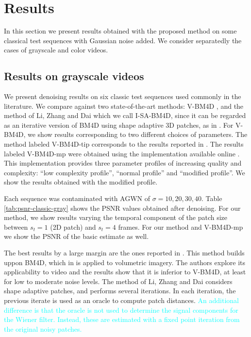 \documentclass[10pt, journal, twocolumn, final, a4paper]{IEEEtran}
\newcommand{\pa}[1]{\textcolor{cyan}{#1}}
\newcommand{\padd}[1]{\pa{#1}}
\begin{document}
\section{Results}
\label{sec:results}

In this section we present results obtained with the proposed
method on some classical test sequences with Gaussian noise added.
We consider separatedly the cases of grayscale and color videos.

\subsection{Results on grayscale videos}

We present denoising results on six classic test sequences used commonly in the
literature. We compare against two state-of-the-art methods: V-BM4D
\cite{Maggioni2012}, and the method of Li, Zhang and Dai \cite{LiZhangDai2011}
which we call I-SA-BM4D, since it can be regarded as an iterative version of BM4D \cite{Maggioni2013}
using shape adaptive 3D patches, as in \cite{Ercole2005}.  
For V-BM4D, we show results corresponding to two
different choices of parameters. The method labeled V-BM4D-tip
corresponds to the results reported
in \cite{Maggioni2012}. The results labeled V-BM4D-mp were
obtained using the implementation available online \cite{bm4dcode}. This
implementation provides three parameter profiles of increasing quality and
complexity: ``low complexity profile'', ``normal profile'' and ``modified
profile''. We show the results obtained with the modified profile.

Each sequence was contaminated with AGWN of $\sigma =
10,20,30,40$. Table \ref{tab:psnr-classic-gray} shows the
PSNR values obtained after denoising. For our method, we show results varying the temporal
component of the patch size between $s_t = 1$ (2D patch) and $s_t = 4$ frames.
For our method and V-BM4D-mp we show the PSNR of the basic estimate as well.

The best results by a large margin are the ones reported in
\cite{LiZhangDai2011}. This method builds uppon BM4D, which in \cite{Maggioni2013}
is applied to volumetric imagery. The authors explore its applicability to video 
and the results show that it is inferior to V-BM4D, at least 
for low to moderate noise levels. The method of Li, Zhang and Dai \cite{LiZhangDai2011} 
considers shape adaptive patches, and performs several iterations. In each iteration,
the previous iterate is used as an oracle to compute patch distances.
\padd{An additional difference is that the oracle is not used to determine the
signal components for the Wiener filter. Instead, these are estimated with a fixed
point iteration from the original noisy patches.}
\end{document}
